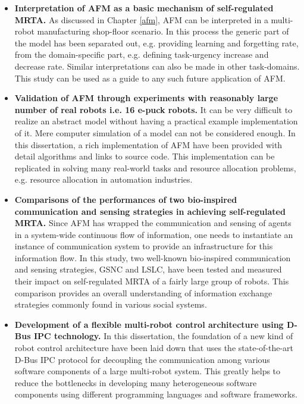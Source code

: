 \begin{itemize}
\item \textbf{Interpretation of AFM as a basic mechanism of self-regulated MRTA.} As discussed in Chapter \ref{afm}, AFM can be  interpreted in a multi-robot manufacturing shop-floor scenario.  In this process  the generic part of the model has been separated out, e.g. providing learning and forgetting rate, from the domain-specific part, e.g. defining task-urgency increase and decrease rate. Similar interpretations can also be made in other task-domains. This study can be used as a guide to any such future application of AFM.
%
\item \textbf{Validation of AFM through experiments with reasonably large number of real robots i.e. 16 e-puck robots.} It can be very difficult to realize an abstract model without having a practical example implementation of it. Mere computer simulation of a model can not be considered enough. In this dissertation,  a rich implementation of AFM  have been provided with detail algorithms and links to source code. This implementation can be replicated in solving many real-world tasks and resource allocation problems, e.g. resource allocation in automation industries.
%
\item \textbf{Comparisons of the performances of two bio-inspired communication and sensing strategies in achieving self-regulated MRTA.} Since AFM has wrapped the communication and sensing of agents  in a system-wide continuous flow of information, one needs to instantiate an instance of communication system to provide an infrastructure for this information flow. In this study,  two well-known bio-inspired  communication and sensing strategies, GSNC and LSLC, have been tested and measured their impact on self-regulated MRTA of a fairly large group of robots. This comparison provides an overall understanding of information exchange strategies commonly found in various social systems.
%
\item \textbf{Development of a flexible multi-robot control architecture using D-Bus IPC technology.} In this dissertation,  the foundation of a new kind of robot control architecture have been laid down that uses the state-of-the-art D-Bus IPC protocol for decoupling the communication among various software components of a large multi-robot system. This greatly helps to reduce the bottlenecks in developing many heterogeneous software components using different programming languages and software frameworks.
%

\end{itemize}
